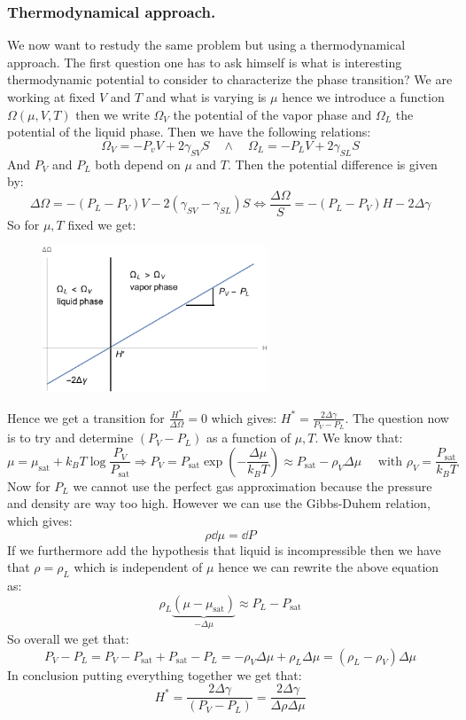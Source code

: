 \documentclass[10pt,a4paper]{book}
\begin{document}
\subsubsection{Thermodynamical approach.}
We now want to restudy the same problem but using a thermodynamical approach. The first question one has to ask himself is what is interesting thermodynamic potential to consider to characterize the phase transition? We are working at fixed $V$ and $T$ and what is varying is $\mu$ hence we introduce a function $\Omega(\mu, V, T)$ then we write $\Omega_V$ the potential of the vapor phase and $\Omega_L$ the potential of the liquid phase. Then we have the following relations:
\[
\Omega_V = - P_v V + 2 \gamma_{SV} S \quad \land \quad \Omega_L = - P_L V + 2 \gamma_{SL} S
\]
And $P_V$ and $P_L$ both depend on $\mu$ and $T$. Then the potential difference is given by:
\[
\Delta \Omega = -(P_L - P_V) V - 2(\gamma_{SV}- \gamma_{SL}) S \Leftrightarrow \frac{\Delta \Omega}{S} = -(P_L - P_V) H - 2 \Delta \gamma
\]
So for $\mu, T$ fixed we get:
\begin{figure}[h!]
\centering
\includegraphics[width = 0.6\textwidth]{graphs/CC_thermo}
\end{figure}
Hence we get a transition for $\frac{H^*}{\Delta \Omega} = 0$ which gives: $H^* = \frac{2 \Delta \gamma}{P_V - P_L}$. The question now is to try and determine $(P_V - P_L)$ as a function of $\mu, T$. We know that:
\[
\mu = \mu_\text{sat} + k_B T \log \frac{P_V}{P_\text{sat}} \Rightarrow P_V = P_\text{sat} \exp(-\frac{\Delta \mu}{k_B T}) \approx P_\text{sat} - \rho_V \Delta \mu \quad \text{ with } \rho_V = \frac{P_\text{sat}}{k_B T}
\]
Now for $P_L$ we cannot use the perfect gas approximation because the pressure and density are way too high. However we can use the Gibbs-Duhem relation, which gives:
\[
\rho \dd \mu = \dd P 
\]
If we furthermore add the hypothesis that liquid is incompressible then we have that $\rho = \rho_L$ which is independent of $\mu$ hence we can rewrite the above equation as:
\[
\rho_L \underbrace{(\mu - \mu_\text{sat})}_{-\Delta \mu} \approx P_L - P_\text{sat}
\]
So overall we get that:
\[
P_V -P_L = P_V - P_\text{sat} + P_\text{sat} - P_L = -\rho_V \Delta \mu + \rho_L \Delta \mu = (\rho_L - \rho_V) \Delta \mu
\]
In conclusion putting everything together we get that:
\[
H^* = \frac{2 \Delta \gamma}{(P_V - P_L)} = \frac{2 \Delta \gamma}{\Delta \rho \Delta \mu}
\]
\end{document}
